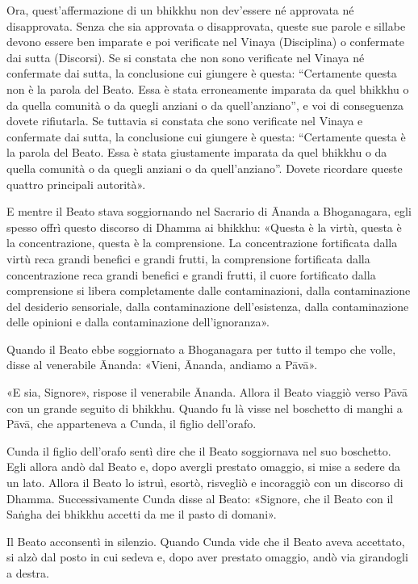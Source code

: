 Ora, quest’affermazione di un bhikkhu non dev’essere né approvata né
disapprovata. Senza che sia approvata o disapprovata, queste sue parole
e sillabe devono essere ben imparate e poi verificate nel Vinaya
(Disciplina) o confermate dai sutta (Discorsi). Se si constata che non
sono verificate nel Vinaya né confermate dai sutta, la conclusione cui
giungere è questa: “Certamente questa non è la parola del Beato. Essa è
stata erroneamente imparata da quel bhikkhu o da quella comunità o da
quegli anziani o da quell’anziano”, e voi di conseguenza dovete
rifiutarla. Se tuttavia si constata che sono verificate nel Vinaya e
confermate dai sutta, la conclusione cui giungere è questa: “Certamente
questa è la parola del Beato. Essa è stata giustamente imparata da quel
bhikkhu o da quella comunità o da quegli anziani o da quell’anziano”.
Dovete ricordare queste quattro principali autorità».




E mentre il Beato stava soggiornando nel Sacrario di Ānanda a
Bhoganagara, egli spesso offrì questo discorso di Dhamma ai bhikkhu:
«Questa è la virtù, questa è la concentrazione, questa è la
comprensione. La concentrazione fortificata dalla virtù reca grandi
benefici e grandi frutti, la comprensione fortificata dalla
concentrazione reca grandi benefici e grandi frutti, il cuore
fortificato dalla comprensione si libera completamente dalle
contaminazioni, dalla contaminazione del desiderio sensoriale, dalla
contaminazione dell’esistenza, dalla contaminazione delle opinioni e
dalla contaminazione dell’ignoranza».




Quando il Beato ebbe soggiornato a Bhoganagara per tutto il tempo che
volle, disse al venerabile Ānanda: «Vieni, Ānanda, andiamo a Pāvā».


«E sia, Signore», rispose il venerabile Ānanda. Allora il Beato viaggiò
verso Pāvā con un grande seguito di bhikkhu. Quando fu là visse nel
boschetto di manghi a Pāvā, che apparteneva a Cunda, il figlio
dell’orafo.


Cunda il figlio dell’orafo sentì dire che il Beato soggiornava nel suo
boschetto. Egli allora andò dal Beato e, dopo avergli prestato omaggio,
si mise a sedere da un lato. Allora il Beato lo istruì, esortò,
risvegliò e incoraggiò con un discorso di Dhamma. Successivamente Cunda
disse al Beato: «Signore, che il Beato con il Saṅgha dei bhikkhu accetti
da me il pasto di domani».


Il Beato acconsentì in silenzio. Quando Cunda vide che il Beato aveva
accettato, si alzò dal posto in cui sedeva e, dopo aver prestato
omaggio, andò via girandogli a destra.


